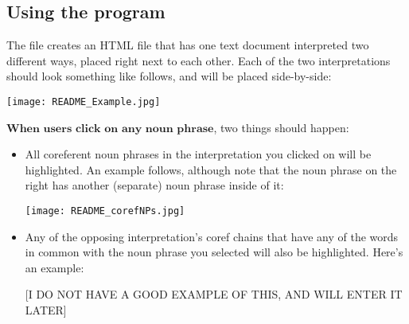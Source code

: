 \documentclass[a4paper]{article}
\begin{document}
\subsection*{Using the program}

The file creates an HTML file that has one text document interpreted two different ways, placed right next to each other. Each of the two interpretations should look something like follows, and will be placed side-by-side:

\texttt{[image: README\_Example.jpg]}

\noindent $\textbf{When users click on any noun phrase}$, two things should happen:

\begin{itemize}
\item All coreferent noun phrases in the interpretation you clicked on will be highlighted. An example follows, although note that the noun phrase on the right has another (separate) noun phrase inside of it:

\texttt{[image: README\_corefNPs.jpg]}

\item Any of the opposing interpretation's coref chains that have any of the words in common with the noun phrase you selected will also be highlighted. Here's an example:

[I DO NOT HAVE A GOOD EXAMPLE OF THIS, AND WILL ENTER IT LATER]
\end{itemize}
\end{document}
